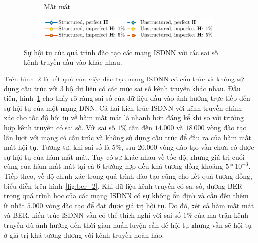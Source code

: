 \begin{figure}[ht]
\begin{subfigure}[b]{0.48\textwidth}
        \caption{Mất mát}
        \label{fig:loss_2}
    \end{subfigure}
    \hfill
    \begin{subfigure}{\linewidth}
        \centering
        \includegraphics[width=.8\linewidth]{figures/lg_performance_21.pdf}
    \end{subfigure}
    \caption{Sự hội tụ của quá trình đào tạo các mạng ISDNN với các sai số kênh truyền đầu vào khác nhau.}
    \label{fig:training_2}
\end{figure}

Trên hình~\ref{fig:training_2} là kết quả của việc đào tạo mạng ISDNN có cấu trúc và không sử dụng cấu trúc với $3$ bộ dữ liệu có các mức sai số kênh truyền khác nhau. Đầu tiên, hình~\ref{fig:loss_2} cho thấy rõ ràng sai số của dữ liệu đầu vào ảnh hưởng trực tiếp đến sự hội tụ của một mạng DNN. 
Cả hai kiến trúc ISDNN với kênh truyền chính xác cho tốc độ hội tụ về hàm mất mát là nhanh hơn đáng kể khi so với trường hợp kênh truyền có sai số. Với sai số $1$\% cần đến $14.000$ và $18.000$ vòng đào tạo lần lượt với mạng có cấu trúc và không sử dụng cấu trúc để đầu ra của hàm mất mát hội tụ. Tương tự, khi sai số là $5$\%, sau $20.000$ vòng đào tạo vẫn chưa có được sự hội tụ của hàm mất mát. Tuy có sự khác nhau về tốc độ, nhưng giá trị cuối cùng của hàm mất mát tại cả $6$ trường hợp đều khá tương đồng khoảng $5*10^{-3}$.
Tiếp theo, về độ chính xác trong quá trình đào tạo cũng cho kết quả tương đồng, biểu diễn trên hình~\ref{fig:ber_2}. Khi dữ liệu kênh truyền có sai số, đường BER trong quá trình học của các mạng ISDNN có sự không ổn định và cần đến thêm ít nhất $5.000$ vòng đào tạo để đạt được giá trị hội tụ. 
Do đó, xét cả hàm mất mát và BER, kiến trúc ISDNN vẫn có thể thích nghi với sai số $1$\% của ma trận kênh truyền dù ảnh hưởng đến thời gian huấn luyện cần để hội tụ nhưng vẫn sẽ hội tụ ở giá trị khá tương đương với kênh truyền hoàn hảo. 

